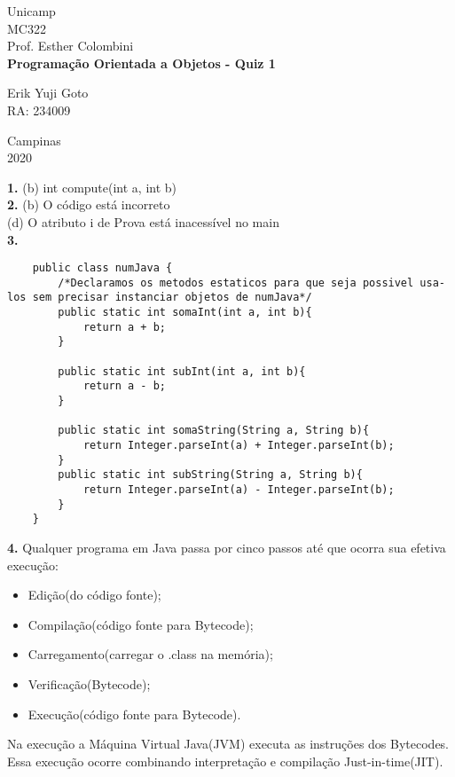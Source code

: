\documentclass[a4paper, 12pt]{article}
\begin{document}
\begin{titlepage} %
	\begin{center} %
		{\large Unicamp}\\[0.2cm] %
		{\large MC322}\\[0.2cm] %
		{\large Prof. Esther Colombini}\\[3.2cm]
		{\bf \huge Programação Orientada a Objetos - Quiz 1}\\[5.1cm] %
	\end{center} %
	{\large Erik Yuji Goto}\\[0.5cm] %
	{\large RA: 234009}\\[10cm]
	\begin{center}
		{\large Campinas}\\[0.2cm]
		{\large 2020}
	\end{center}
\end{titlepage} %

\newpage
\textbf{1.} (b) int compute(int a, int b)\\

\textbf{2.} (b) O código está incorreto\\
(d) O atributo i de Prova está inacessível no main\\

\textbf{3.}
\begin{lstlisting}
	public class numJava {
		/*Declaramos os metodos estaticos para que seja possivel usa-los sem precisar instanciar objetos de numJava*/
		public static int somaInt(int a, int b){
			return a + b;
		}
		
		public static int subInt(int a, int b){
			return a - b;
		}
		
		public static int somaString(String a, String b){
			return Integer.parseInt(a) + Integer.parseInt(b);
		}
		public static int subString(String a, String b){
			return Integer.parseInt(a) - Integer.parseInt(b);
		}
	}
\end{lstlisting}

\textbf{4.} Qualquer programa em Java passa por cinco passos até que ocorra sua efetiva execução:
	\begin{itemize}
		\item Edição(do código fonte);
		\item Compilação(código fonte para Bytecode);
		\item Carregamento(carregar o .class na memória);
		\item Verificação(Bytecode);
		\item Execução(código fonte para Bytecode).
	\end{itemize}
Na execução a Máquina Virtual Java(JVM) executa as instruções dos Bytecodes. Essa execução ocorre combinando interpretação e compilação Just-in-time(JIT).\\
\end{document}
